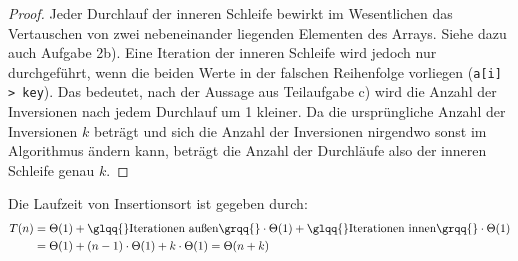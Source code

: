 \documentclass[11pt,a4paper]{article}
\begin{document}
\begin{loesung}
\begin{enumerate}
\begin{proof}
            Jeder Durchlauf der inneren Schleife bewirkt im Wesentlichen das Vertauschen von zwei nebeneinander liegenden Elementen des Arrays.
            Siehe dazu auch Aufgabe 2b).
            Eine Iteration der inneren Schleife wird jedoch nur durchgeführt, wenn die beiden Werte in der falschen Reihenfolge vorliegen (\texttt{a[i] > key}).
            Das bedeutet, nach der Aussage aus Teilaufgabe c) wird die Anzahl der Inversionen nach jedem Durchlauf um 1 kleiner.
            Da die ursprüngliche Anzahl der Inversionen $k$ beträgt und sich die Anzahl der Inversionen nirgendwo sonst im Algorithmus ändern kann, beträgt die Anzahl der Durchläufe also der inneren Schleife genau $k$.
        \end{proof}
        Die Laufzeit von Insertionsort ist gegeben durch: 
        \begin{align*}
            T(n) &= \Theta(1) + \text{\glqq{}Iterationen außen\grqq{}} \cdot \Theta(1) + \text{\glqq{}Iterationen innen\grqq{}} \cdot \Theta(1) \\
            &= \Theta(1) + (n - 1) \cdot \Theta(1) + k \cdot \Theta(1) = \Theta(n + k)
        \end{align*}




\end{enumerate}
\end{loesung}
\end{document}
